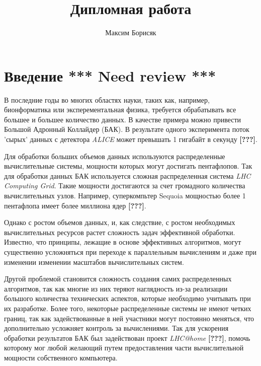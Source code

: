\documentclass[10pt,a4paper]{article}
\author{Максим Борисяк}
\title{Дипломная работа}
\begin{document}
\maketitle

\section{Введение \textbf{*** Need review ***}}
В последние годы во многих областях науки, таких как, например, бионформатика или эксперементальная физика,
требуется обрабатывать все большее и большее количество данных.
В качестве примера можно привести Большой Адронный Коллайдер (БАК). 
В результате одного эксперимента поток 'сырых' данных с детектора \textit{ALICE} может превышать 1 гигабайт в секунду \textbf{[???]}.

Для обработки больших объемов данных используются распределенные вычислительные системы, мощности которых могут достигать пентафлопов.
Так для обработки данных БАК используется сложная распределенная система \textit{LHC Computing Grid}.
Такие мощности достигаются за счет громадного количества вычислительных узлов. Например, суперкомпьтер Sequoia мощностью более 1 пентафлопа
имеет более миллиона ядер \textbf{[???]}.

Однако с ростом объемов данных, и, как следствие, с ростом необходимых вычислительных ресурсов растет сложность задач эффективной обработки.
Известно, что принципы, лежащие в основе эффективных алгоритмов, могут существенно усложняться при переходе к параллельным вычислениям
и даже при изменении изменении масштабов вычислительных систем.

Другой проблемой становится сложность создания самих распределенных алгоритмов,
так как многие из них теряют наглядность из-за реализации большого количества технических аспектов, которые необходимо учитывать при их разработке.
Более того, некоторые распределенные системы не имеют четких границ, так как задействованные в ней участники могут постоянно меняться,
что дополнительно усложняет контроль за вычислениями.
Так для ускорения обработки результатов БАК был задействован проект \textit{LHC@home} \textbf{[???]}, помочь которому мог любой желающий путем предоставления части
вычислительной мощности собственного компьютера.
\end{document}
